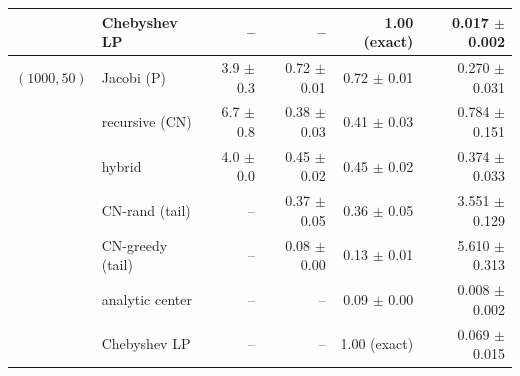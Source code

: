 \begin{table}[!htbp]
\begin{tabular}{llrrrr}
 & Chebyshev LP & -- & -- & 1.00 (exact) & 0.017 $\pm$ 0.002 \\
\midrule
$(1000,50)$ & Jacobi (P) & 3.9 $\pm$ 0.3 & 0.72 $\pm$ 0.01 & 0.72 $\pm$ 0.01 & 0.270 $\pm$ 0.031 \\
 & recursive (CN) & 6.7 $\pm$ 0.8 & 0.38 $\pm$ 0.03 & 0.41 $\pm$ 0.03 & 0.784 $\pm$ 0.151 \\
 & hybrid & 4.0 $\pm$ 0.0 & 0.45 $\pm$ 0.02 & 0.45 $\pm$ 0.02 & 0.374 $\pm$ 0.033 \\
 & CN-rand (tail) & -- & 0.37 $\pm$ 0.05 & 0.36 $\pm$ 0.05 & 3.551 $\pm$ 0.129 \\
 & CN-greedy (tail) & -- & 0.08 $\pm$ 0.00 & 0.13 $\pm$ 0.01 & 5.610 $\pm$ 0.313 \\
 & analytic center & -- & -- & 0.09 $\pm$ 0.00 & 0.008 $\pm$ 0.002 \\
 & Chebyshev LP & -- & -- & 1.00 (exact) & 0.069 $\pm$ 0.015 \\
\bottomrule
\end{tabular}
\end{table}
